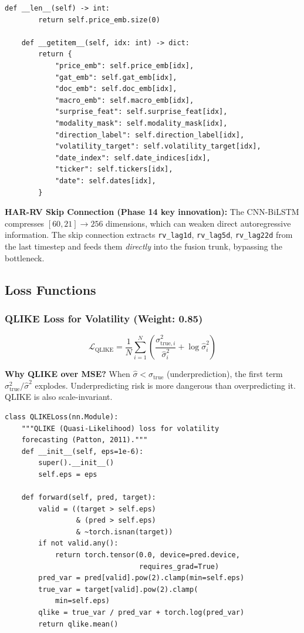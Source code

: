 \documentclass[12pt,a4paper]{article}
\begin{document}
\begin{lstlisting}[caption={Fusion dataset masking (src/data/fusion\_dataset.py)}]
    def __len__(self) -> int:
        return self.price_emb.size(0)

    def __getitem__(self, idx: int) -> dict:
        return {
            "price_emb": self.price_emb[idx],
            "gat_emb": self.gat_emb[idx],
            "doc_emb": self.doc_emb[idx],
            "macro_emb": self.macro_emb[idx],
            "surprise_feat": self.surprise_feat[idx],
            "modality_mask": self.modality_mask[idx],
            "direction_label": self.direction_label[idx],
            "volatility_target": self.volatility_target[idx],
            "date_index": self.date_indices[idx],
            "ticker": self.tickers[idx],
            "date": self.dates[idx],
        }
\end{lstlisting}

\textbf{HAR-RV Skip Connection (Phase 14 key innovation):}
The CNN-BiLSTM compresses $[60, 21] \to 256$ dimensions, which can weaken direct autoregressive information. The skip connection extracts \texttt{rv\_lag1d}, \texttt{rv\_lag5d}, \texttt{rv\_lag22d} from the last timestep and feeds them \textit{directly} into the fusion trunk, bypassing the bottleneck.

\subsection{Loss Functions}

\subsubsection{QLIKE Loss for Volatility (Weight: 0.85)}

\begin{equation}
    \mathcal{L}_{\text{QLIKE}} = \frac{1}{N}\sum_{i=1}^N \left(\frac{\sigma^2_{\text{true},i}}{\hat{\sigma}^2_i} + \log\hat{\sigma}^2_i\right)
\end{equation}

\textbf{Why QLIKE over MSE?} When $\hat{\sigma} < \sigma_{\text{true}}$ (underprediction), the first term $\sigma^2_{\text{true}}/\hat{\sigma}^2$ explodes. Underpredicting risk is more dangerous than overpredicting it. QLIKE is also scale-invariant.

\begin{lstlisting}[caption={QLIKE loss (src/models/losses.py)}]
class QLIKELoss(nn.Module):
    """QLIKE (Quasi-Likelihood) loss for volatility
    forecasting (Patton, 2011)."""
    def __init__(self, eps=1e-6):
        super().__init__()
        self.eps = eps

    def forward(self, pred, target):
        valid = ((target > self.eps)
                 & (pred > self.eps)
                 & ~torch.isnan(target))
        if not valid.any():
            return torch.tensor(0.0, device=pred.device,
                                requires_grad=True)
        pred_var = pred[valid].pow(2).clamp(min=self.eps)
        true_var = target[valid].pow(2).clamp(
            min=self.eps)
        qlike = true_var / pred_var + torch.log(pred_var)
        return qlike.mean()
\end{lstlisting}
\end{document}
